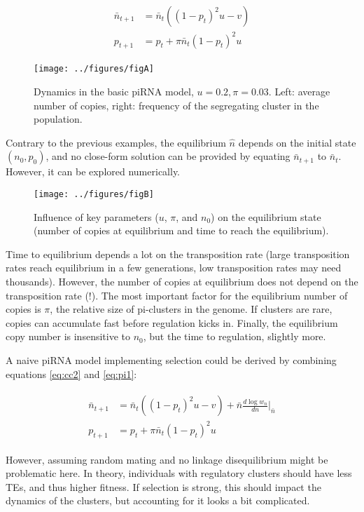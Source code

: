 \documentclass[10pt,a4paper]{article}
\begin{document}
\begin{align}\label{eq:pi1}
\begin{split}
\bar n_{t+1} &= \bar n_t( (1-p_t)^2 u - v) \\
p_{t+1} &= p_t + \pi \bar n_t (1-p_t)^2 u
\end{split}
\end{align}

\begin{figure}[h]
\begin{center}
	\texttt{[image: ../figures/figA]}
\caption{Dynamics in the basic piRNA model, $u=0.2, \pi=0.03$. Left: average number of copies, right: frequency of the segregating cluster in the population. }
\end{center}
\end{figure}


Contrary to the previous examples, the equilibrium $\hat n$  depends on the initial state $(n_0, p_0)$, and no close-form solution can be provided by equating $\bar n_{t+1}$ to $\bar n_t$. However, it can be explored numerically.


\begin{figure}[t]
\begin{center}
\texttt{[image: ../figures/figB]}
\caption{Influence of key parameters ($u$, $\pi$, and $n_0$) on the equilibrium state (number of copies at equilibrium and time to reach the equilibrium). }
\end{center}
\end{figure}

Time to equilibrium depends a lot on the transposition rate (large transposition rates reach equilibrium in a few generations, low transposition rates may need thousands). However, the number of copies at equilibrium does not depend on the transposition rate (!). The most important factor for the equilibrium number of copies is $\pi$, the relative size of pi-clusters in the genome. If clusters are rare, copies can accumulate fast before regulation kicks in. Finally, the equilibrium copy number is insensitive to $n_0$, but the time to regulation, slightly more. 

A naive piRNA model implementing selection could be derived by combining equations \ref{eq:cc2} and \ref{eq:pi1}:

\begin{align}\label{eq:pi2}
\begin{split}
\bar n_{t+1} &= \bar n_t((1-p_t)^2 u - v) + \bar n \frac{d \log w_n}{d n} \Bigr|_{\bar n}\\
p_{t+1} &= p_t + \pi \bar n_t (1-p_t)^2 u
\end{split}
\end{align}

However, assuming random mating and no linkage disequilibrium might be problematic here. In theory, individuals with regulatory clusters should have less TEs, and thus higher fitness. If selection is strong, this should impact the dynamics of the clusters, but accounting for it looks a bit complicated. 
\end{document}

